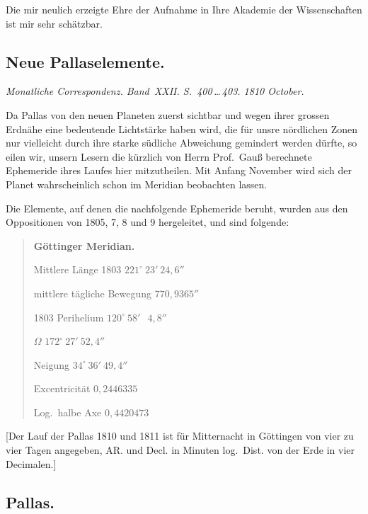 \documentclass[12pt,a4paper]{book}
\begin{document}
Die mir neulich erzeigte Ehre der Aufnahme in Ihre Akademie der Wissenschaften ist mir sehr sch\"atzbar.


\newpage
\subsection*{Neue Pallaselemente.}

\textit{Monatliche Correspondenz. Band~XXII. S.~400\,\ldots\,403. 1810 October.}

Da Pallas von den neuen Planeten zuerst sichtbar und wegen ihrer grossen Erdn\"ahe eine bedeutende Lichtst\"arke haben wird, die f\"ur unsre n\"ordlichen Zonen nur vielleicht durch ihre starke s\"udliche Abweichung gemindert werden d\"urfte, so eilen wir, unsern Lesern die k\"urzlich von Herrn Prof.~Gau{\ss} berechnete Ephemeride ihres Laufes hier mitzutheilen. Mit Anfang November wird sich der Planet wahrscheinlich schon im Meridian beobachten lassen.

Die Elemente, auf denen die nachfolgende Ephemeride beruht, wurden aus den Oppositionen von 1805, 7, 8 und 9 hergeleitet, und sind folgende:

\begin{quote}
\textbf{G\"ottinger Meridian.}

Mittlere L\"ange 1803 \dotfill $221^{\circ}\ 23'\ 24{,}6''$

mittlere t\"agliche Bewegung \dotfill $770{,}9365''$

1803 Perihelium \dotfill $120^{\circ}\ 58'\ \phantom{0}4{,}8''$

\phantom{1803} $\Omega$ \dotfill $172^{\circ}\ 27'\ 52{,}4''$

Neigung \dotfill $34^{\circ}\ 36'\ 49{,}4''$

Excentricit\"at \dotfill $0{,}2446335$

Log.~halbe Axe \dotfill $0{,}4420473$
\end{quote}

[Der Lauf der Pallas 1810 und 1811 ist f\"ur Mitternacht in G\"ottingen von vier zu vier Tagen angegeben, AR. und Decl. in Minuten log.~Dist. von der Erde in vier Decimalen.]


\newpage
\subsection*{Pallas.}
\end{document}

